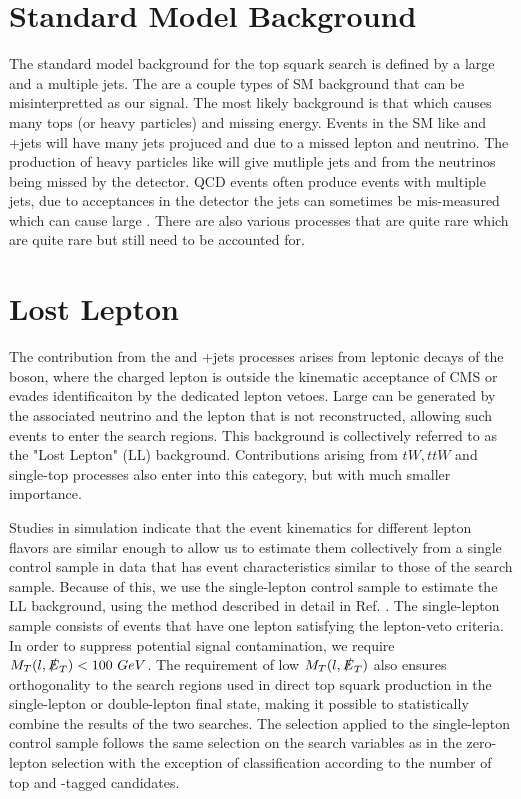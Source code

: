 \section{Standard Model Background}
\label{sec:SMBackground}

The standard model background for the top squark search is defined by a large \met{} and a multiple jets. The are a couple types of SM background that can be misinterpretted as our signal. The most likely background is that which causes many tops (or heavy particles) and missing energy. Events in the SM like \ttbar{} and \W+jets will have many jets projuced and \met{} due to a missed lepton and neutrino. The production of heavy particles like \Znunu{} will give mutliple jets and \met{} from the neutrinos being missed by the detector. QCD events often produce events with multiple jets, due to acceptances in the detector the jets can sometimes be mis-measured which can cause large \met{}. There are also various processes that are quite rare which are quite rare but still need to be accounted for. 

\section{Lost Lepton}
\label{sec:LL}

The contribution from the \ttbar{} and \W+jets processes arises from leptonic decays of the \W{} boson, where the charged lepton is outside the kinematic acceptance of CMS or evades identificaiton by the dedicated lepton vetoes. Large \met{} can be generated by the associated neutrino and the lepton that is not reconstructed, allowing such events to enter the search regions. This background is collectively referred to as the "Lost Lepton" (LL) background. Contributions arising from $tW, ttW$ and single-top processes also enter into this category, but with much smaller importance. 

Studies in simulation indicate that the event kinematics for different lepton flavors are similar enough to allow us to estimate them collectively from a single control sample in data that has event characteristics similar to those of the search sample. Because of this, we use the single-lepton control sample to estimate the LL background, using the method described in detail in Ref. \cite{bravo_search_2015}. The single-lepton sample consists of events that have one lepton satisfying the lepton-veto criteria. In order to suppress potential signal contamination, we require $M_T(l,\slashed{E}_{T})<100~GeV$. The requirement of low $M_T(l,\slashed{E}_{T})$ also ensures orthogonality to the search regions used in direct top squark production in the single-lepton or double-lepton final state, making it possible to statistically combine the results of the two searches. The selection applied to the single-lepton control sample follows the same selection on the search variables as in the zero-lepton selection with the exception of classification according to the number of top and \W-tagged candidates. 

